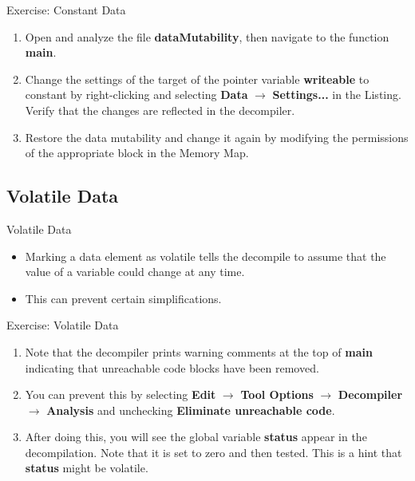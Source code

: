 \documentclass{beamer}
\begin{document}
\begin{frame}
\begin{block}{Exercise: Constant Data}
\begin{enumerate}
\item Open and analyze the file \textbf{dataMutability}, then navigate to the function \textbf{main}.
\item Change the settings of the target of the pointer variable \textbf{writeable} to constant by right-clicking and selecting \textbf{Data} $\rightarrow$ \textbf{Settings...}
in the Listing.  Verify that the changes are reflected in the decompiler.
\item Restore the data mutability and change it again by modifying the permissions of the appropriate block in the Memory Map.
\end{enumerate}
\end{block}
\end{frame}

\subsection{Volatile Data}
\begin{frame}
\begin{block}{Volatile Data}
\begin{itemize}
\item Marking a data element as volatile tells the decompile to assume that the value of a variable could change at any time.
\item This can prevent certain simplifications.
\end{itemize}
\end{block}
\end{frame}

\begin{frame}
\begin{block}{Exercise: Volatile Data}
\begin{enumerate}
\item Note that the decompiler prints warning comments at the top of \textbf{main} indicating that unreachable code blocks have been removed.
\item You can prevent this by selecting \textbf{Edit} $\rightarrow$ \textbf{Tool Options} $\rightarrow$ \textbf{Decompiler} $\rightarrow$ \textbf{Analysis} and unchecking
\textbf {Eliminate unreachable code}.
\item After doing this, you will see the global variable \textbf{status} appear in the decompilation.  Note that it is set to zero and then tested.  This is a hint that
\textbf{status} might be volatile.
\end{enumerate}
\end{block}
\end{frame}
\end{document}
